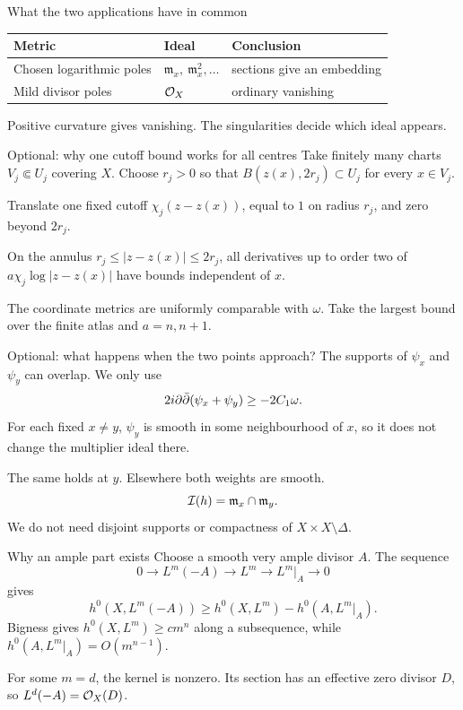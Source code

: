 \begin{frame}{What the two applications have in common}
\begin{center}
\renewcommand{\arraystretch}{1.8}
\begin{tabular}{lll}
Metric & Ideal & Conclusion\\
\hline
Chosen logarithmic poles & \(\mathfrak m_x,\ \mathfrak m_x^2,\ldots\) & sections give an embedding\\
Mild divisor poles & \(\mathcal O_X\) & ordinary vanishing
\end{tabular}
\end{center}
\par\bigskip
Positive curvature gives vanishing.
The singularities decide which ideal appears.
\end{frame}

\begin{frame}{Optional: why one cutoff bound works for all centres}
Take finitely many charts \(V_j\Subset U_j\) covering \(X\). Choose \(r_j>0\) so that \(B(z(x),2r_j)\subset U_j\) for every \(x\in V_j\).
\par\medskip
Translate one fixed cutoff \(\chi_j(z-z(x))\), equal to \(1\) on radius \(r_j\), and zero beyond \(2r_j\).
\par\medskip
On the annulus \(r_j\le|z-z(x)|\le2r_j\), all derivatives up to order two of \(a\chi_j\log|z-z(x)|\) have bounds independent of \(x\).
\par\medskip
The coordinate metrics are uniformly comparable with \(\omega\). Take the largest bound over the finite atlas and \(a=n,n+1\).
\end{frame}

\begin{frame}{Optional: what happens when the two points approach?}
The supports of \(\psi_x\) and \(\psi_y\) can overlap. We only use
\[
2i\partial\bar\partial(\psi_x+\psi_y)\ge-2C_1\omega.
\]
For each fixed \(x\ne y\), \(\psi_y\) is smooth in some neighbourhood of \(x\), so it does not change the multiplier ideal there.
\par\medskip
The same holds at \(y\). Elsewhere both weights are smooth.
\[
\mathcal I(h)=\mathfrak m_x\cap\mathfrak m_y.
\]
We do not need disjoint supports or compactness of \(X\times X\setminus\Delta\).
\end{frame}

\begin{frame}{Why an ample part exists}
Choose a smooth very ample divisor \(A\). The sequence
\[
0\to L^m(-A)\to L^m\to L^m|_A\to0
\]
gives
\[
h^0(X,L^m(-A))\ge h^0(X,L^m)-h^0(A,L^m|_A).
\]
Bigness gives \(h^0(X,L^m)\ge c m^n\) along a subsequence, while
\(h^0(A,L^m|_A)=O(m^{n-1})\).
\par\medskip
For some \(m=d\), the kernel is nonzero. Its section has an effective zero divisor \(D\), so \(L^d(-A)=\mathcal O_X(D)\).
\end{frame}

